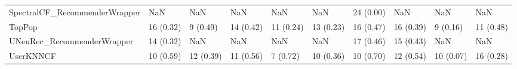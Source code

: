 \begin{tabular}{llllllllll}
      SpectralCF\_RecommenderWrapper &                      NaN &         NaN &           NaN &          NaN &                  NaN &           24 (0.00) &               NaN &                NaN &               NaN \\
                             TopPop &                16 (0.32) &    9 (0.49) &     14 (0.42) &    11 (0.24) &            13 (0.23) &           16 (0.47) &         16 (0.39) &           9 (0.16) &         11 (0.48) \\
         UNeuRec\_RecommenderWrapper &                14 (0.32) &         NaN &           NaN &          NaN &                  NaN &           17 (0.46) &         15 (0.43) &                NaN &               NaN \\
                          UserKNNCF &                10 (0.59) &   12 (0.39) &     11 (0.56) &     7 (0.72) &            10 (0.36) &           10 (0.70) &         12 (0.54) &          10 (0.07) &         16 (0.28) \\
\bottomrule
\end{tabular}
